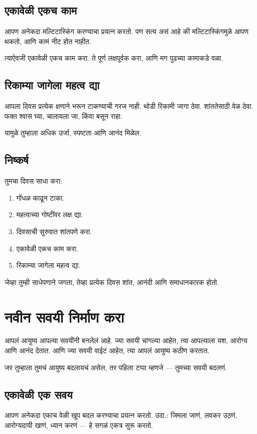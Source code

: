 \section*{एकावेळी एकच काम}
आपण अनेकदा मल्टिटास्किंग करण्याचा प्रयत्न करतो.  
पण सत्य असं आहे की मल्टिटास्किंगमुळे आपण थकतो,  
आणि कामं नीट होत नाहीत.  

त्याऐवजी एकावेळी एकच काम करा.  
ते पूर्ण लक्षपूर्वक करा,  
आणि मग पुढच्या कामाकडे वळा.  

\section*{रिकाम्या जागेला महत्व द्या}
आपला दिवस प्रत्येक क्षणाने भरून टाकण्याची गरज नाही.  
थोडी रिकामी जागा ठेवा.  
शांततेसाठी वेळ ठेवा.  
फक्त श्वास घ्या, चालायला जा, किंवा बसून राहा.  

यामुळे तुम्हाला अधिक उर्जा, स्पष्टता आणि आनंद मिळेल.  

\section*{निष्कर्ष}
तुमचा दिवस साधा करा:  
\begin{enumerate}
\item गोंधळ काढून टाका.  
\item महत्वाच्या गोष्टींवर लक्ष द्या.  
\item दिवसाची सुरुवात शांतपणे करा.  
\item एकावेळी एकच काम करा.  
\item रिकाम्या जागेला महत्व द्या.  
\end{enumerate}

जेव्हा तुम्ही साधेपणाने जगता,  
तेव्हा प्रत्येक दिवस शांत, आनंदी आणि समाधानकारक होतो.  



\chapter{नवीन सवयी निर्माण करा}

आपलं आयुष्य आपल्या सवयींनी बनलेलं आहे.  
ज्या सवयी चांगल्या आहेत, त्या आपल्याला यश, आरोग्य आणि आनंद देतात.  
आणि ज्या सवयी वाईट आहेत, त्या आपलं आयुष्य कठीण करतात.  

जर तुम्हाला तुमचं आयुष्य बदलायचं असेल,  
तर पहिला टप्पा म्हणजे — तुमच्या सवयी बदलणं.  

\section*{एकावेळी एक सवय}
आपण अनेकदा एकाच वेळी खूप बदल करण्याचा प्रयत्न करतो.  
उदा.:  
जिमला जाणं, लवकर उठणं,  
आरोग्यदायी खाणं, ध्यान करणं — हे सगळं एकत्र सुरू करतो.  

